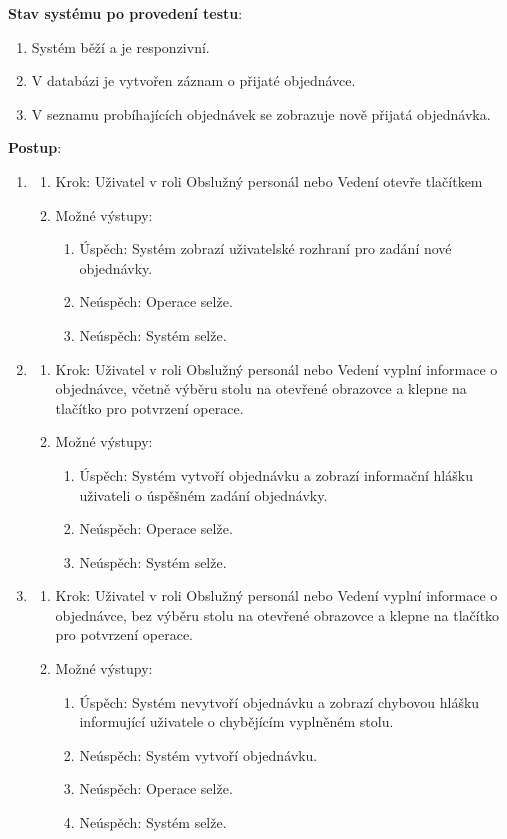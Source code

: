 \documentclass[a4paper,10pt]{article}
\begin{document}
\textbf{Stav systému po provedení testu}:
\begin{enumerate}
	\item Systém běží a je responzivní.
	\item V databázi je vytvořen záznam o přijaté objednávce.
	\item V seznamu probíhajících objednávek se zobrazuje nově přijatá objednávka.
\end{enumerate}

\textbf{Postup}:
\begin{enumerate}

	\item 
	\begin{enumerate}
		\item Krok: Uživatel v roli Obslužný personál nebo Vedení otevře tlačítkem 
		\item Možné výstupy:
		\begin{enumerate}
			\item Úspěch: Systém zobrazí uživatelské rozhraní pro zadání nové objednávky.
			\item Neúspěch: Operace selže. 
			\item Neúspěch: Systém selže. 
		\end{enumerate} 
	\end{enumerate}

	\item 
	\begin{enumerate}
		\item Krok: Uživatel v roli Obslužný personál nebo Vedení vyplní informace o objednávce, včetně výběru stolu na otevřené obrazovce a klepne na tlačítko  pro potvrzení operace.
		\item Možné výstupy:
		\begin{enumerate}
			\item Úspěch: Systém vytvoří objednávku a zobrazí informační hlášku uživateli o úspěšném zadání objednávky.
			\item Neúspěch: Operace selže.
			\item Neúspěch: Systém selže.
		\end{enumerate} 
	\end{enumerate}

	\item 
	\begin{enumerate}
		\item Krok: Uživatel v roli Obslužný personál nebo Vedení vyplní informace o objednávce, bez výběru stolu na otevřené obrazovce a klepne na tlačítko  pro potvrzení operace.
		\item Možné výstupy:
		\begin{enumerate}
			\item Úspěch: Systém nevytvoří objednávku a zobrazí chybovou hlášku informující uživatele o chybějícím vyplněném stolu.
			\item Neúspěch: Systém vytvoří objednávku.
			\item Neúspěch: Operace selže.
			\item Neúspěch: Systém selže.
		\end{enumerate} 
	\end{enumerate}


\end{enumerate}
\end{document}
